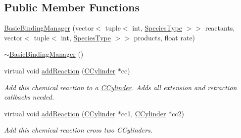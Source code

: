 \subsection*{Public Member Functions}
\begin{DoxyCompactItemize}
\item 
\hyperlink{classBasicBindingManager_ad57b38f098621ae0408069c49c17db52}{Basic\+Binding\+Manager} (vector$<$ tuple$<$ int, \hyperlink{Species_8h_a50651af47c56ea0e27235468d23542cf}{Species\+Type} $>$$>$ reactants, vector$<$ tuple$<$ int, \hyperlink{Species_8h_a50651af47c56ea0e27235468d23542cf}{Species\+Type} $>$$>$ products, float rate)
\item 
\hyperlink{classBasicBindingManager_ab382b0c661238e95df9d64f556ddc6d4}{$\sim$\+Basic\+Binding\+Manager} ()
\item 
virtual void \hyperlink{classBasicBindingManager_a9dbb688abc218187913b23fa3dccd97d}{add\+Reaction} (\hyperlink{classCCylinder}{C\+Cylinder} $\ast$cc)
\begin{DoxyCompactList}\small\item\em Add this chemical reaction to a \hyperlink{classCCylinder}{C\+Cylinder}. Adds all extension and retraction callbacks needed. \end{DoxyCompactList}\item 
virtual void \hyperlink{classBasicBindingManager_aea22a428f792f83f02ba58796ccd882e}{add\+Reaction} (\hyperlink{classCCylinder}{C\+Cylinder} $\ast$cc1, \hyperlink{classCCylinder}{C\+Cylinder} $\ast$cc2)
\begin{DoxyCompactList}\small\item\em Add this chemical reaction cross two C\+Cylinders. \end{DoxyCompactList}\end{DoxyCompactItemize}
